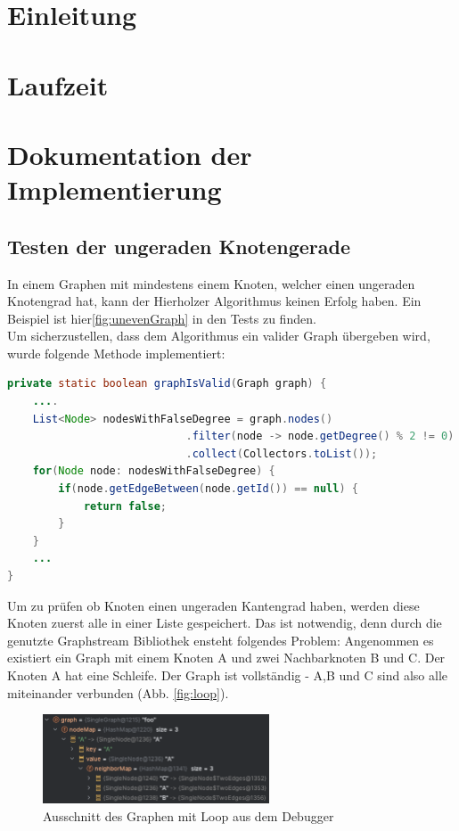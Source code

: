 \section{Einleitung}

\section{Laufzeit}

\section{Dokumentation der Implementierung}

\subsection{Testen der ungeraden Knotengerade}

In einem Graphen mit mindestens einem Knoten, welcher einen ungeraden Knotengrad hat, kann der Hierholzer Algorithmus keinen Erfolg haben. Ein Beispiel ist hier\ref{fig:unevenGraph} in den Tests zu finden.\\

Um sicherzustellen, dass dem Algorithmus ein valider Graph übergeben wird, wurde folgende Methode implementiert:

\begin{lstlisting}[language = java, frame = trBL]
private static boolean graphIsValid(Graph graph) {
    ....
    List<Node> nodesWithFalseDegree = graph.nodes()
                            .filter(node -> node.getDegree() % 2 != 0)
                            .collect(Collectors.toList());        
    for(Node node: nodesWithFalseDegree) {
        if(node.getEdgeBetween(node.getId()) == null) {
            return false;
        }
    }
    ...
}
\end{lstlisting}

Um zu prüfen ob Knoten einen ungeraden Kantengrad haben, werden diese Knoten zuerst alle in einer Liste gespeichert. Das ist notwendig, denn durch die genutzte Graphstream Bibliothek ensteht folgendes Problem: Angenommen es existiert ein Graph mit einem Knoten A und zwei Nachbarknoten B und C. Der Knoten A hat eine Schleife. Der Graph ist vollständig - A,B und C sind also alle miteinander verbunden (Abb. \ref{fig:loop}). 

\begin{figure}[htbp]
	\centering
		\includegraphics[width=0.6\textwidth]{Latex/Figs/loopedGraphDebugger.png}		
	\caption{Ausschnitt des Graphen mit Loop aus dem Debugger}
	\label{fig:loopedGraphDebugger}
\end{figure}

